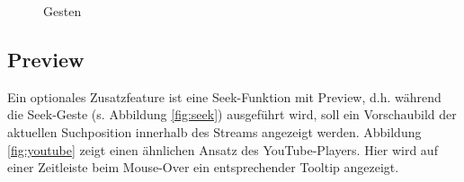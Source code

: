 \documentclass[a4paper,12pt]{article}
\begin{document}
\begin{figure}[H]
\centering
{}
\caption{Gesten}
\label{fig:gestures}
\end{figure}

\subsection{Preview}
Ein optionales Zusatzfeature ist eine Seek-Funktion mit Preview, d.h. während die Seek-Geste (s. Abbildung \ref{fig:seek}) ausgeführt wird, soll ein Vorschaubild der aktuellen Suchposition innerhalb des Streams angezeigt werden. Abbildung \ref{fig:youtube} zeigt einen ähnlichen Ansatz des YouTube-Players. Hier wird auf einer Zeitleiste beim Mouse-Over ein entsprechender Tooltip angezeigt.
\end{document}
